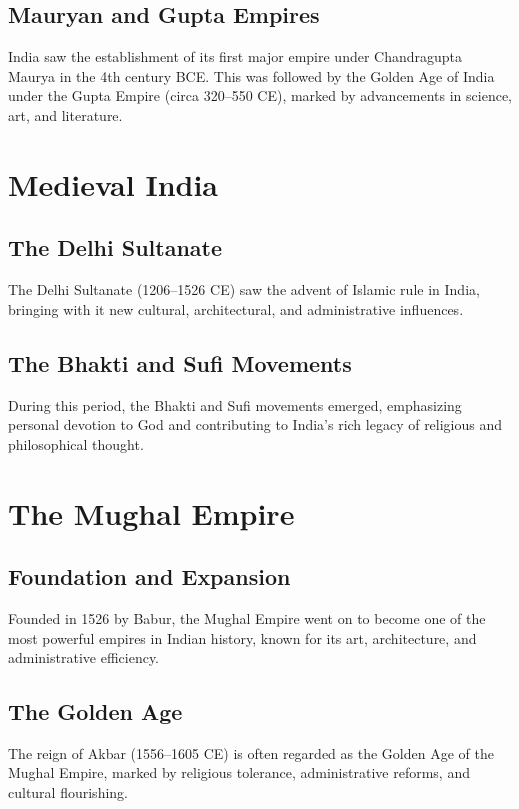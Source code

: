 \documentclass{book}
\begin{document}
\subsection{Mauryan and Gupta Empires}
India saw the establishment of its first major empire under Chandragupta Maurya in the 4th century BCE. This was followed by the Golden Age of India under the Gupta Empire (circa 320–550 CE), marked by advancements in science, art, and literature.

\section{Medieval India}
\label{sec:medieval-india}

\subsection{The Delhi Sultanate}
The Delhi Sultanate (1206–1526 CE) saw the advent of Islamic rule in India, bringing with it new cultural, architectural, and administrative influences.

\subsection{The Bhakti and Sufi Movements}
During this period, the Bhakti and Sufi movements emerged, emphasizing personal devotion to God and contributing to India’s rich legacy of religious and philosophical thought.

\section{The Mughal Empire}
\label{sec:mughal-empire}

\subsection{Foundation and Expansion}
Founded in 1526 by Babur, the Mughal Empire went on to become one of the most powerful empires in Indian history, known for its art, architecture, and administrative efficiency.

\subsection{The Golden Age}
The reign of Akbar (1556–1605 CE) is often regarded as the Golden Age of the Mughal Empire, marked by religious tolerance, administrative reforms, and cultural flourishing.
\end{document}

